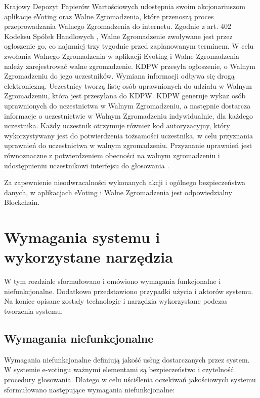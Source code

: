 \documentclass[a4paper,12pt]{book}
\begin{document}
Krajowy Depozyt Papierów Wartościowych udostępnia swoim akcjonariuszom aplikacje eVoting oraz Walne Zgromadzenia, które przenoszą proces przeprowadzania Walnego Zgromadzenia do internetu. Zgodnie z art. 402 Kodeksu Spółek Handlowych \cite{sp-han}, Walne Zgromadzenie zwoływane jest przez ogłoszenie go, co najmniej trzy tygodnie przed zaplanowanym terminem. W celu zwołania Walnego Zgromadzenia w aplikacji Evoting i Walne Zgromadzenia należy zarejestrować walne zgromadzenie. KDPW przesyła ogłoszenie, o Walnym Zgromadzeniu do jego uczestników. Wymiana informacji odbywa się drogą elektroniczną.
Uczestnicy tworzą listę osób uprawnionych do udziału w Walnym Zgromadzeniu, która jest przesyłana do KDPW. KDPW generuje wykaz osób uprawnionych do uczestnictwa w Walnym Zgromadzeniu, a następnie dostarcza informacje o uczestnictwie w Walnym Zgromadzeniu indywidualnie, dla każdego uczestnika. Każdy uczestnik otrzymuje również kod autoryzacyjny, który wykorzystywany jest do potwierdzenia tożsamości uczestnika, w celu przyznania uprawnień do uczestnictwa w walnym zgromadzeniu. Przyznanie uprawnień jest równoznaczne z potwierdzeniem obecności na walnym zgromadzeniu i udostępnieniu uczestnikowi interfejsu do głosowania \cite{eVoting-dzialanie}.

Za zapewnienie nieodwracalności wykonanych akcji i ogólnego bezpieczeństwa danych, w aplikacjach eVoting i Walne Zgromadzenia jest odpowiedzialny Blockchain.

\chapter{Wymagania systemu i wykorzystane narzędzia}
W tym rozdziale sformułowano i omówiono wymagania funkcjonalne i niefunkcjonalne. Dodatkowo przedstawiono przypadki użycia i aktorów systemu. Na koniec opisane zostały technologie i narzędzia wykorzystane podczas tworzenia systemu.

\section {Wymagania niefunkcjonalne}

Wymagania niefunkcjonalne definiują jakość usług dostarczanych przez system. W systemie e-votingu ważnymi elementami są bezpieczeństwo i czytelność procedury głosowania. Dlatego w celu uściślenia oczekiwań jakościowych systemu sformułowano następujące wymagania niefunkcjonalne:
\end{document}

